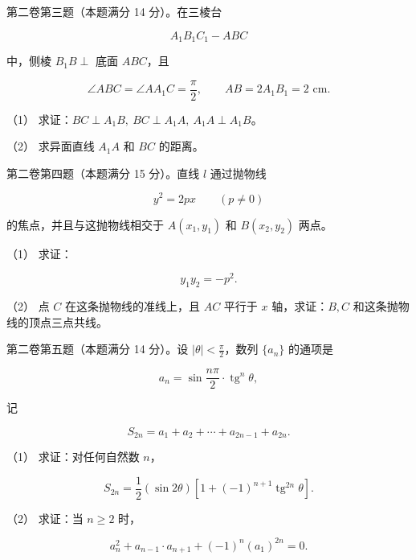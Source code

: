 \begin{question}

第二卷第三题（本题满分 14 分）。在三棱台

\nopagebreak[4]
\[
A_1B_1C_1-ABC
\]

中，侧棱 $B_1B\perp$ 底面 $ABC$，且

\nopagebreak[4]
\[
\angle ABC=\angle AA_1C=\frac\pi2,\qquad
AB=2A_1B_1=2\text{ cm}.
\]
\nopagebreak[4]
\begin{center}\end{center}
\nopagebreak[4]
（1） 求证：$BC\perp A_1B,\ BC\perp A_1A,\ A_1A\perp A_1B$。

（2） 求异面直线 $A_1A$ 和 $BC$ 的距离。

\end{question}
\begin{question}

第二卷第四题（本题满分 15 分）。直线 $l$ 通过抛物线

\nopagebreak[4]
\[
y^2=2px\qquad(p\ne0)
\]

的焦点，并且与这抛物线相交于 $A(x_1,y_1)$ 和 $B(x_2,y_2)$ 两点。

（1） 求证：

\nopagebreak[4]
\[
y_1y_2=-p^2.
\]

（2） 点 $C$ 在这条抛物线的准线上，且 $AC$ 平行于 $x$ 轴，求证：$B,C$ 和这条抛物线的顶点三点共线。

\end{question}
\begin{question}

第二卷第五题（本题满分 14 分）。设 $|\theta|<\frac\pi2$，数列 $\{a_n\}$ 的通项是

\nopagebreak[4]
\[
a_n=\sin\frac{n\pi}{2}\cdot\operatorname{tg}^n\theta,
\]

记

\nopagebreak[4]
\[
S_{2n}=a_1+a_2+\cdots+a_{2n-1}+a_{2n}.
\]

（1） 求证：对任何自然数 $n$，

\nopagebreak[4]
\[
S_{2n}=\frac12(\sin2\theta)
\left[1+(-1)^{n+1}\operatorname{tg}^{2n}\theta\right].
\]

（2） 求证：当 $n\ge2$ 时，

\nopagebreak[4]
\[
a_n^2+a_{n-1}\cdot a_{n+1}+(-1)^n(a_1)^{2n}=0.
\]

\end{question}